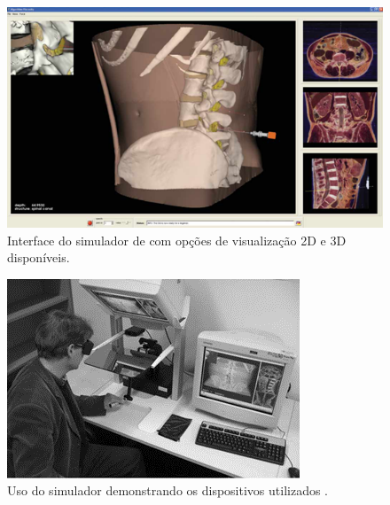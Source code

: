 \begin{figure}[ht!]
    \centering
    \includegraphics[width=0.8\linewidth]{capitulos/figuras/farberSimVisual.png} 
    \caption{Interface do simulador de \textcite{Farber2009} com opções de visualização 2D e 3D disponíveis.}
    \label{fig:farberSimVisual}
\end{figure}

\begin{figure}[ht!]
    \centering
    \includegraphics[width=0.5\linewidth]{capitulos/figuras/farberSimDispositivos.png} 
    \caption{Uso do simulador demonstrando os dispositivos utilizados \cite{Farber2009}.}
    \label{fig:farberSimDispositivos}
\end{figure}

